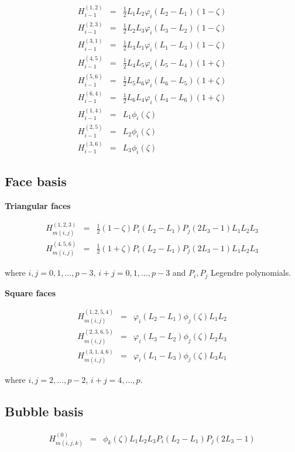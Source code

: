 \begin{eqnarray*}
H_{i-1}^{(1,2)}&=&\frac{1}{2}L_1L_2\varphi_i(L_2-L_1)(1-\zeta) \\
H_{i-1}^{(2,3)}&=&\frac{1}{2}L_2L_3\varphi_i(L_3-L_2)(1-\zeta) \\
H_{i-1}^{(3,1)}&=&\frac{1}{2}L_3L_1\varphi_i(L_1-L_3)(1-\zeta) \\
H_{i-1}^{(4,5)}&=&\frac{1}{2}L_4L_5\varphi_i(L_5-L_4)(1+\zeta) \\
H_{i-1}^{(5,6)}&=&\frac{1}{2}L_5L_6\varphi_i(L_6-L_5)(1+\zeta) \\
H_{i-1}^{(6,4)}&=&\frac{1}{2}L_6L_4\varphi_i(L_4-L_6)(1+\zeta) \\
H_{i-1}^{(1,4)}&=&L_1\phi_i(\zeta) \\
H_{i-1}^{(2,5)}&=&L_2\phi_i(\zeta) \\
H_{i-1}^{(3,6)}&=&L_3\phi_i(\zeta)
\end{eqnarray*}

\subsection{Face basis}

\noindent \textbf{Triangular faces}

\begin{eqnarray*}
H_{m(i,j)}^{(1,2,3)}&=&\frac{1}{2}(1-\zeta) P_i(L_2-L_1)
P_j(2L_3-1)L_1L_2L_3 \\
H_{m(i,j)}^{(4,5,6)}&=&\frac{1}{2}(1+\zeta) P_i(L_2-L_1)
P_j(2L_3-1)L_1L_2L_3
\end{eqnarray*}

\noindent where $i,j=0,1,\ldots,p-3$, $i+j=0,1,\ldots,p-3$ and
$P_i,P_j$ Legendre polynomials.

\noindent \textbf{Square faces}

\begin{eqnarray*}
H_{m(i,j)}^{(1,2,5,4)}&=&\varphi_i(L_2-L_1)\phi_j(\zeta)L_1L_2 \\
H_{m(i,j)}^{(2,3,6,5)}&=&\varphi_i(L_3-L_2)\phi_j(\zeta)L_2L_3 \\
H_{m(i,j)}^{(3,1,4,6)}&=&\varphi_i(L_1-L_3)\phi_j(\zeta)L_3L_1
\end{eqnarray*}

\noindent where $i,j=2,\ldots,p-2$, $i+j=4,\ldots,p$.

\subsection{Bubble basis}

\begin{eqnarray*}
H_{m(i,j,k)}^{(0)}&=&\phi_k(\zeta)L_1L_2L_3 P_i(L_2-L_1) P_j(2L_3-1)
\end{eqnarray*}

